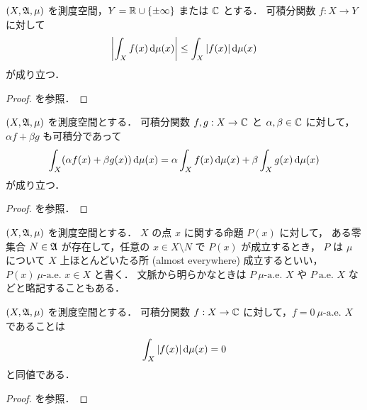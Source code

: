\begin{theorem}
    $(X,\mathfrak{A},\mu)$ を測度空間，$Y=\mathbb{R}\cup\{\pm\infty\} $ または $\mathbb{C}$ とする．
    可積分関数 $f:X\to Y$ に対して
    \begin{align*}
        \left\lvert\int_Xf(x)\,\mathrm{d}\mu(x)\right\rvert
        \le\int_X|f(x)|\,\mathrm{d}\mu(x)
    \end{align*}
    が成り立つ．
\end{theorem}

\begin{proof}
    \cite[定理 12.1]{It63} を参照．
\end{proof}

\begin{theorem}
    $(X,\mathfrak{A},\mu)$ を測度空間とする．
    可積分関数 $f,g:X\to\mathbb{C}$ と $\alpha,\beta\in\mathbb{C}$ に対して，
    $\alpha f+\beta g$ も可積分であって
    \begin{align*}
        \int_X(\alpha f(x)+\beta g(x))\,\mathrm{d}\mu(x)
        =\alpha\int_Xf(x)\,\mathrm{d}\mu(x)+\beta\int_Xg(x)\,\mathrm{d}\mu(x)
    \end{align*}
    が成り立つ．
\end{theorem}

\begin{proof}
    \cite[定理 12.3, 系 1]{It63} を参照．
\end{proof}

\begin{definition}
    $(X,\mathfrak{A},\mu)$ を測度空間とする．
    $X$ の点 $x$ に関する命題 $P(x)$ に対して，
    ある零集合 $N\in\mathfrak{A}$ が存在して，任意の $x\in X\setminus N$ で $P(x)$ が成立するとき，
    $P$ は $\mu$ について $X$ 上ほとんどいたる所 (almost everywhere) 成立するといい，
    $P(x)\ \textrm{$\mu$-a.e.\ $x\in X$}$ と書く．
    文脈から明らかなときは $P\ \textrm{$\mu$-a.e.\ $X$}$ や $P\ \textrm{a.e.\ $X$}$ などと略記することもある．
\end{definition}

\begin{theorem}
    $(X,\mathfrak{A},\mu)$ を測度空間とする．
    可積分関数 $f:X\to\mathbb{C}$ に対して，$f=0\ \textrm{$\mu$-a.e.\ $X$}$ であることは
    \begin{align*}
        \int_X|f(x)|\,\mathrm{d}\mu(x)=0
    \end{align*}
    と同値である．
\end{theorem}

\begin{proof}
    \cite[定理 12.3, 系 2]{It63} を参照．
\end{proof}


